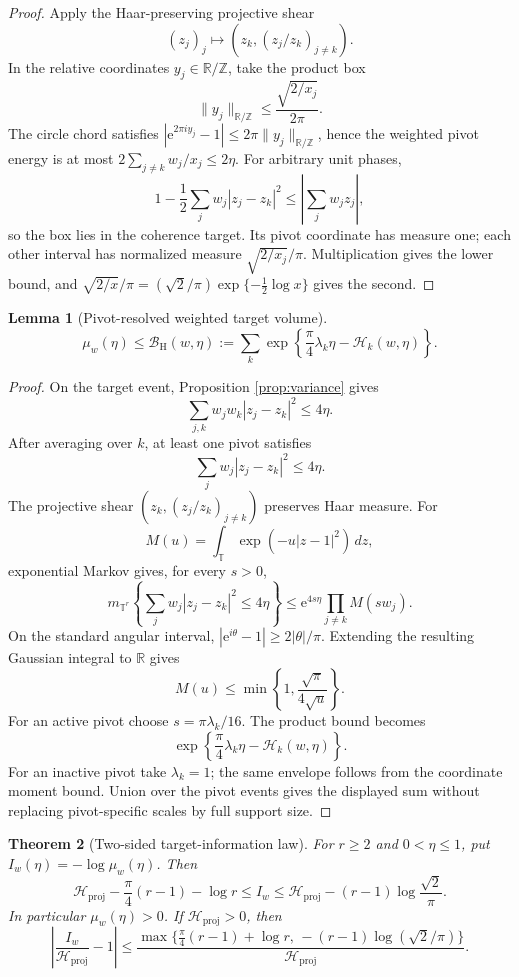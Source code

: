 \documentclass[10pt]{article}
\newtheorem{theorem}{Theorem}[section]
\newtheorem{lemma}[theorem]{Lemma}
\theoremstyle{definition}
\newcommand{\R}{\mathbb R}
\newcommand{\Z}{\mathbb Z}
\newcommand{\T}{\mathbb T}
\newcommand{\proj}{\mathrm{proj}}
\newcommand{\Hwater}{\mathcal H}
\newcommand{\Bhaar}{\mathcal B_{\mathrm H}}
\newcommand{\ee}{\mathrm e}
\begin{document}
\begin{proof}
Apply the Haar-preserving projective shear
\[
 (z_j)_j\longmapsto
 \left(z_k,(z_j/z_k)_{j\ne k}\right).
\]
In the relative coordinates \(y_j\in\mathbb R/\mathbb Z\), take the product box
\[
 \|y_j\|_{\R/\Z}\leq\frac{\sqrt{2/x_j}}{2\pi}.
\]
The circle chord satisfies
\(|\ee^{2\pi iy_j}-1|\leq2\pi\|y_j\|_{\R/\Z}\), hence the weighted pivot
energy is at most \(2\sum_{j\ne k}w_j/x_j\leq2\eta\).  For arbitrary unit
phases,
\[
 1-\frac12\sum_jw_j|z_j-z_k|^2
 \leq\left|\sum_jw_jz_j\right|,
\]
so the box lies in the coherence target.  Its pivot coordinate has measure
one; each other interval has normalized measure
\(\sqrt{2/x_j}/\pi\).  Multiplication gives the lower bound, and
\(\sqrt{2/x}/\pi=(\sqrt2/\pi)\exp\{-\frac12\log x\}\) gives the second.
\end{proof}

\begin{lemma}[Pivot-resolved weighted target volume]
\label{lem:target}
\[
 \mu_w(\eta)\leq\Bhaar(w,\eta):=
 \sum_k\exp\left\{\frac{\pi}{4}\lambda_k\eta
 -\Hwater_k(w,\eta)\right\}.
\]
\end{lemma}

\begin{proof}
On the target event, Proposition \ref{prop:variance} gives
\[
 \sum_{j,k}w_jw_k|z_j-z_k|^2\leq4\eta.
\]
After averaging over \(k\), at least one pivot satisfies
\[
 \sum_jw_j|z_j-z_k|^2\leq4\eta.
\]
The projective shear \((z_k,(z_j/z_k)_{j\ne k})\) preserves Haar measure.
For
\[
 M(u)=\int_{\T}\exp(-u|z-1|^2)\,dz,
\]
exponential Markov gives, for every \(s>0\),
\[
 m_{\T^r}\left\{\sum_jw_j|z_j-z_k|^2\leq4\eta\right\}
 \leq\ee^{4s\eta}\prod_{j\ne k}M(sw_j).
\]
On the standard angular interval,
\(|\ee^{i\theta}-1|\geq2|\theta|/\pi\).  Extending the resulting Gaussian
integral to \(\R\) gives
\[
 M(u)\leq\min\left\{1,\frac{\sqrt\pi}{4\sqrt u}\right\}.
\]
For an active pivot choose \(s=\pi\lambda_k/16\).  The product bound becomes
\[
 \exp\left\{\frac{\pi}{4}\lambda_k\eta-\Hwater_k(w,\eta)\right\}.
\]
For an inactive pivot take \(\lambda_k=1\); the same envelope follows from
the coordinate moment bound.  Union over the pivot events gives the displayed
sum without replacing pivot-specific scales by full support size.
\end{proof}

\begin{theorem}[Two-sided target-information law]
\label{thm:target-information}
For \(r\geq2\) and \(0<\eta\leq1\), put
\(I_w(\eta)=-\log\mu_w(\eta)\).  Then
\[
 \Hwater_{\proj}-\frac{\pi}{4}(r-1)-\log r
 \leq I_w
 \leq\Hwater_{\proj}-(r-1)\log\frac{\sqrt2}{\pi}.
\]
In particular \(\mu_w(\eta)>0\).  If \(\Hwater_{\proj}>0\), then
\[
 \left|\frac{I_w}{\Hwater_{\proj}}-1\right|
 \leq
 \frac{\max\{\frac{\pi}{4}(r-1)+\log r,\,
 -(r-1)\log(\sqrt2/\pi)\}}{\Hwater_{\proj}}.
\]
\end{theorem}
\end{document}
